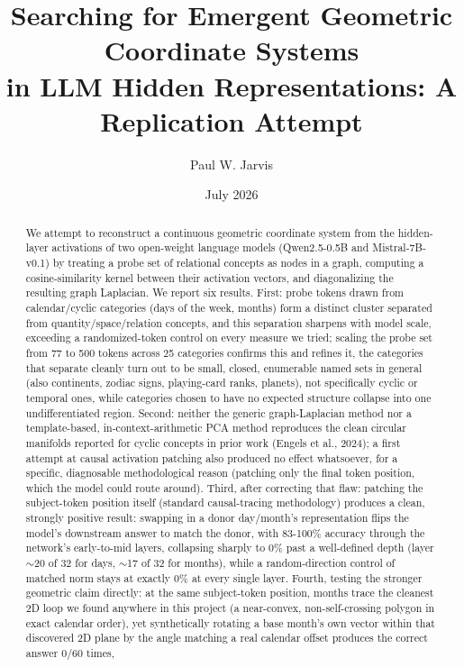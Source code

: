 \documentclass[11pt]{article}
\title{Searching for Emergent Geometric Coordinate Systems\\
in LLM Hidden Representations: A Replication Attempt}
\author{Paul W. Jarvis}
\date{July 2026}
\begin{document}
\maketitle

\begin{abstract}
We attempt to reconstruct a continuous geometric coordinate system from the
hidden-layer activations of two open-weight language models (Qwen2.5-0.5B and
Mistral-7B-v0.1) by treating a probe set of relational concepts as nodes in a
graph, computing a cosine-similarity kernel between their activation vectors,
and diagonalizing the resulting graph Laplacian. We report six results.
First: probe tokens drawn from calendar/cyclic categories (days of the week,
months) form a distinct cluster separated from quantity/space/relation
concepts, and this separation sharpens with model scale, exceeding a
randomized-token control on every measure we tried; scaling the probe set
from 77 to 500 tokens across 25 categories confirms this and refines it, the
categories that separate cleanly turn out to be small, closed, enumerable
named sets in general (also continents, zodiac signs, playing-card ranks,
planets), not specifically cyclic or temporal ones, while categories chosen
to have no expected structure collapse into one undifferentiated region. Second: neither the
generic graph-Laplacian method nor a template-based, in-context-arithmetic PCA
method reproduces the clean circular manifolds reported for cyclic concepts in
prior work (Engels et al., 2024); a first attempt at causal activation
patching also produced no effect whatsoever, for a specific, diagnosable
methodological reason (patching only the final token position, which the
model could route around). Third, after correcting that flaw: patching the
subject-token position itself (standard causal-tracing methodology) produces a
clean, strongly positive result: swapping in a donor day/month's
representation flips the model's downstream answer to match the donor, with
83-100\% accuracy through the network's early-to-mid layers, collapsing
sharply to 0\% past a well-defined depth (layer $\sim$20 of 32 for days,
$\sim$17 of 32 for months), while a random-direction control of matched
norm stays at exactly 0\% at every single layer. Fourth, testing the stronger
geometric claim directly: at the same subject-token position, months trace
the cleanest 2D loop we found anywhere in this project (a near-convex,
non-self-crossing polygon in exact calendar order), yet synthetically
rotating a base month's own vector within that discovered 2D plane by the
angle matching a real calendar offset produces the correct answer 0/60 times,

\end{abstract}
\end{document}
